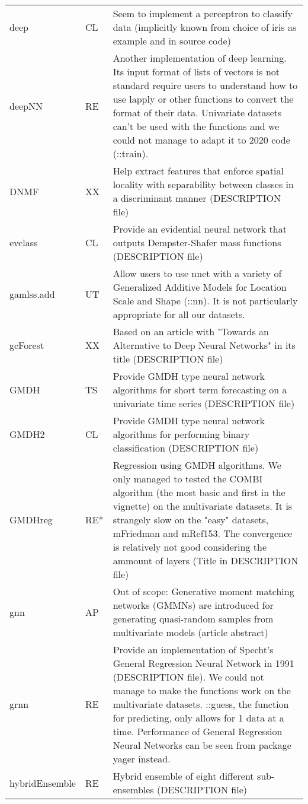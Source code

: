 \begin{Schunk}
\begin{longtable}[t]{ll>{\raggedright\arraybackslash}p{10cm}}
deep & CL & Seem to implement a perceptron to classify data (implicitly known from choice of iris as example and in source code)\\
deepNN & RE & Another implementation of deep learning. Its input format of lists of vectors is not standard require users to understand how to use lapply or other functions to convert the format of their data. Univariate datasets can't be used with the functions and we could not manage to adapt it to 2020 code (::train).\\
\addlinespace
DNMF & XX & Help extract features that enforce spatial locality with separability between classes in a discriminant manner (DESCRIPTION file)\\
evclass & CL & Provide an evidential neural network that outputs Dempster-Shafer mass functions (DESCRIPTION file)\\
gamlss.add & UT & Allow users to use nnet with a variety of Generalized Additive Models for Location Scale and Shape (::nn). It is not particularly appropriate for all our datasets.\\
gcForest & XX & Based on an article with "Towards an Alternative to Deep Neural Networks" in its title (DESCRIPTION file)\\
GMDH & TS & Provide GMDH type neural network algorithms for short term forecasting on a univariate time series (DESCRIPTION file)\\
\addlinespace
GMDH2 & CL & Provide GMDH type neural network algorithms for performing binary classification (DESCRIPTION file)\\
GMDHreg & RE* & Regression using GMDH algorithms. We only managed to tested the COMBI algorithm (the most basic and first in the vignette) on the multivariate datasets. It is strangely slow on the "easy" datasets, mFriedman and mRef153. The convergence is relatively not good considering the ammount of layers (Title in DESCRIPTION file)\\
gnn & AP & Out of scope: Generative moment matching networks (GMMNs) are introduced for generating quasi-random samples from multivariate models (article abstract)\\
grnn & RE & Provide an implementation of Specht's General Regression Neural Network in 1991 (DESCRIPTION file). We could not manage to make the functions work on the multivariate datasets. ::guess, the function for predicting, only allows for 1 data at a time. Performance of General Regression Neural Networks can be seen from package yager instead.\\
hybridEnsemble & RE & Hybrid ensemble of eight different sub-ensembles (DESCRIPTION file)\\

\end{longtable}
\end{Schunk}
